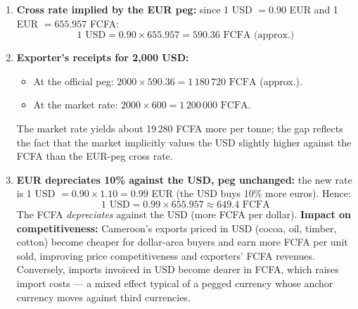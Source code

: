 \documentclass[11pt]{article}
\begin{document}
\begin{corrige}
\begin{enumerate}
\item \textbf{Cross rate implied by the EUR peg:} since 1 USD $= 0.90$ EUR and 1 EUR $= 655.957$ FCFA:
\[ 1 \text{ USD} = 0.90 \times 655.957 = \boxed{590.36 \text{ FCFA (approx.)}} \]

\item \textbf{Exporter's receipts for 2,000 USD:}
\begin{itemize}
\item At the official peg: $2000 \times 590.36 = \boxed{1\,180\,720 \text{ FCFA}}$ (approx.).
\item At the market rate: $2000 \times 600 = \boxed{1\,200\,000 \text{ FCFA}}$.
\end{itemize}
The market rate yields about 19\,280 FCFA more per tonne; the gap reflects the fact that the market implicitly values the USD slightly higher against the FCFA than the EUR-peg cross rate.

\item \textbf{EUR depreciates 10\% against the USD, peg unchanged:} the new rate is 1 USD $= 0.90 \times 1.10 = 0.99$ EUR (the USD buys 10\% more euros). Hence:
\[ 1 \text{ USD} = 0.99 \times 655.957 \approx \boxed{649.4 \text{ FCFA}} \]
The FCFA \emph{depreciates} against the USD (more FCFA per dollar). \textbf{Impact on competitiveness:} Cameroon's exports priced in USD (cocoa, oil, timber, cotton) become cheaper for dollar-area buyers and earn more FCFA per unit sold, improving price competitiveness and exporters' FCFA revenues. Conversely, imports invoiced in USD become dearer in FCFA, which raises import costs — a mixed effect typical of a pegged currency whose anchor currency moves against third currencies.
\end{enumerate}
\end{corrige}
\end{document}
